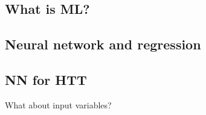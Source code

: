 \subsection*{What is ML?}


\subsection*{Neural network and regression}






\subsection*{NN for HTT}


\begin{frame}
\begin{center}
\large What about input variables?
\end{center}
\end{frame}





